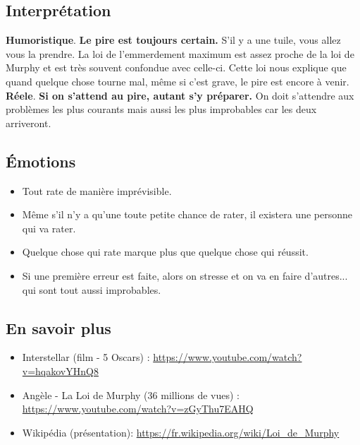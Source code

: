 \begin{multicols}{2}
\subsection*{Interprétation}

\textbf{Humoristique}. \textbf{\og Le pire est toujours certain.\fg} S'il y a une tuile, vous allez vous la prendre. La \og loi de l’emmerdement maximum\fg \: est assez proche de la loi de Murphy et est très souvent confondue avec celle-ci. Cette loi nous explique que quand quelque chose tourne mal, même si c'est grave, le pire est encore à venir. \vspace{0.3cm} \\ 
\textbf{Réele}. \textbf{\og Si on s'attend au pire, autant s'y préparer.\fg} On doit s'attendre aux problèmes les plus courants mais aussi les plus improbables car les deux arriveront. 


\subsection*{Émotions}

\begin{itemize}
    \item Tout rate de manière imprévisible. 
    \item Même s'il n'y a qu'une toute petite chance de rater, il existera une personne qui va rater.  
    \item Quelque chose qui rate marque plus que quelque chose qui réussit. 
    \item Si une première erreur est faite, alors on stresse et on va en faire d'autres... qui sont tout aussi improbables.
\end{itemize}

\end{multicols}

\subsection*{En savoir plus}

\begin{itemize}
    \item Interstellar (film - 5 Oscars) : \url{https://www.youtube.com/watch?v=hqakovYHnQ8}
    \item Angèle - La Loi de Murphy (36 millions de vues) : \url{https://www.youtube.com/watch?v=zGyThu7EAHQ}
    \item Wikipédia (présentation): \url{https://fr.wikipedia.org/wiki/Loi_de_Murphy}
\end{itemize}

